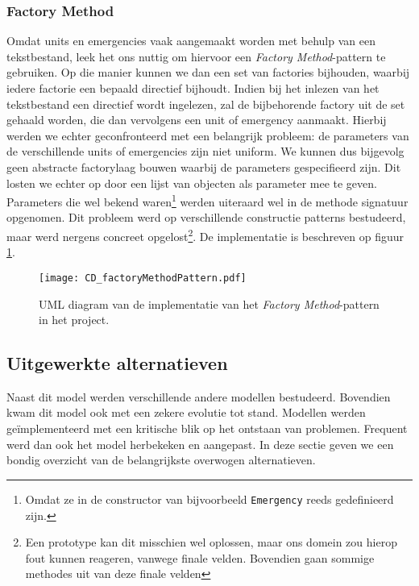 \subsubsection{Factory Method}
Omdat units en emergencies vaak aangemaakt worden met behulp van een tekstbestand, leek het ons nuttig om hiervoor een \textit{Factory Method}-pattern te gebruiken. Op die manier kunnen we dan een set van factories bijhouden, waarbij iedere factorie een bepaald directief bijhoudt. Indien bij het inlezen van het tekstbestand een directief wordt ingelezen, zal de bijbehorende factory uit de set gehaald worden, die dan vervolgens een unit of emergency aanmaakt. Hierbij werden we echter geconfronteerd met een belangrijk probleem: de parameters van de verschillende units of emergencies zijn niet uniform. We kunnen dus bijgevolg geen abstracte factorylaag bouwen waarbij de parameters gespecifieerd zijn. Dit losten we echter op door een lijst van objecten als parameter mee te geven. Parameters die wel bekend waren\footnote{Omdat ze in de constructor van bijvoorbeeld \texttt{Emergency} reeds gedefinieerd zijn.} werden uiteraard wel in de methode signatuur opgenomen. Dit probleem werd op verschillende constructie patterns bestudeerd, maar werd nergens concreet opgelost\footnote{Een prototype kan dit misschien wel oplossen, maar ons domein zou hierop fout kunnen reageren, vanwege finale velden. Bovendien gaan sommige methodes uit van deze finale velden}. De implementatie is beschreven op figuur \ref{fig:factoryMethodPattern}.
\begin{figure}[h!]
\texttt{[image: CD\_factoryMethodPattern.pdf]}
\caption{UML diagram van de implementatie van het \textit{Factory Method}-pattern in het project.}
\label{fig:factoryMethodPattern}
\end{figure}
\subsection{Uitgewerkte alternatieven}
Naast dit model werden verschillende andere modellen bestudeerd. Bovendien kwam dit model ook met een zekere evolutie tot stand. Modellen werden ge\"implementeerd met een kritische blik op het ontstaan van problemen. Frequent werd dan ook het model herbekeken en aangepast. In deze sectie geven we een bondig overzicht van de belangrijkste overwogen alternatieven.
